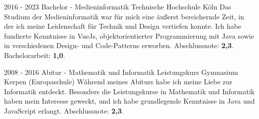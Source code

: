 \begin{paracol}{2}
\begin{rightcolumn}

\cvevent
	{2016 - 2023}
	{Bachelor - Medieninformatik}
	{Technische Hochschule Köln}
	{
		Das Studium der Medieninformatik war für mich eine äußerst bereichernde Zeit, in der ich meine Leidenschaft für Technik und Design vertiefen konnte. Ich habe fundierte Kenntnisse in VueJs, objektorientierter Programmierung mit Java sowie in verschiedenen Design- und Code-Patterns erworben.
	}
	{Abschlussnote: \textbf{2,3}. Bachelorarbeit: \textbf{1,0}.}
\vfill\null

\vspace{6pt}

\cvevent
	{2008 - 2016}
	{Abitur - Mathematik und Informatik Leistungskurs}
	{Gymnasium Kerpen (Europaschule)}
	{
		Während meines Abiturs habe ich meine Liebe zur Informatik entdeckt. Besonders die Leistungskurse in Mathematik und Informatik haben mein Interesse geweckt, und ich habe grundlegende Kenntnisse in Java und JavaScript erlangt.
	}
	{Abschlussnote: \textbf{2,3}.}
\vfill\null

\vfill
\vfill
\vfill
\end{rightcolumn}
\end{paracol}